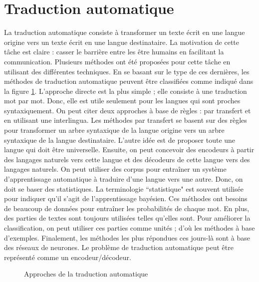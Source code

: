 \documentclass{KodeBook}
\begin{document}
\section{Traduction automatique}

La traduction automatique consiste à transformer un texte écrit en une langue origine vers un texte écrit en une langue destinataire.
La motivation de cette tâche est claire : casser le barrière entre les être humains en facilitant la communication. 
Plusieurs méthodes ont été proposées pour cette tâche en utilisant des différentes techniques. 
En se basant sur le type de ces dernières, les méthodes de traduction automatique peuvent être classifiées comme indiqué dans la figure \ref{fig:mt-class}. 
L'approche directe est la plus simple ; elle consiste à une traduction mot par mot. 
Donc, elle est utile seulement pour les langues qui sont proches syntaxiquement.
On peut citer deux approches à base de règles : par transfert et en utilisant une interlingua.
Les méthodes par transfert se basent sur des règles pour transformer un arbre syntaxique de la langue origine vers un arbre syntaxique de la langue destinataire. 
L'autre idée est de proposer toute une langue qui doit être universelle.
Ensuite, on peut concevoir des encodeurs à partir des langages naturels vers cette langue et des décodeurs de cette langue vers des langages naturels.
On peut utiliser des corpus pour entraîner un système d'apprentissage automatique à traduire d'une langue vers une autre. 
Donc, on doit se baser des statistiques. 
La terminologie ``statistique" est souvent utilisée pour indiquer qu'il s'agit de l'apprentissage bayésien. 
Ces méthodes ont besoins de beaucoup de données pour entraîner les probabilités de chaque mot. 
En plus, des parties de textes sont toujours utilisées telles qu'elles sont. 
Pour améliorer la classification, on peut utiliser ces parties comme unités ; d'où les méthodes à base d'exemples.
Finalement, les méthodes les plus répondues ces jours-là sont à base des réseaux de neurones. 
Le problème de traduction automatique peut être représenté comme un encodeur/décodeur.

\begin{figure}[!ht]
	\centering
	\caption{Approches de la traduction automatique}
	\label{fig:mt-class}
\end{figure}
\end{document}
